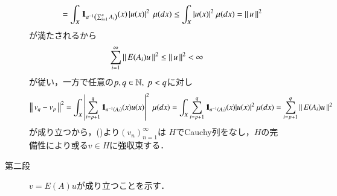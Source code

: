 \begin{prf}
\begin{description}
\begin{description}
\begin{align}
							&\qquad = \int_X \mbox{1}\hspace{-0.25em}\mbox{l}_{a^{-1}\left( \sum_{i=1}^{n}A_i \right)}(x) \left| u(x) \right|^2\ \mu(dx)
							\leq \int_X |u(x)|^2\ \mu(dx)
							= \left\|\, u\, \right\|_{}^2
						\end{align}
						が満たされるから
						\begin{align}
							\sum_{i=1}^{\infty} \left\|\, E(A_i) u\, \right\|_{}^2 \leq \left\|\, u\, \right\|_{}^2 < \infty
							\label{eq:report_9_2}
						\end{align}
						が従い，一方で任意の$p,q \in \mathbb{N},\ p < q$に対し
						\begin{align}
							\left\|\, v_q - v_p\, \right\|_{}^2
							= \int_X \left| \sum_{i=p+1}^{q} \mbox{1}\hspace{-0.25em}\mbox{l}_{a^{-1}(A_i)}(x) u(x) \right|^2\ \mu(dx)
							= \int_X \sum_{i=p+1}^{q} \mbox{1}\hspace{-0.25em}\mbox{l}_{a^{-1}(A_i)}(x) |u(x)|^2\ \mu(dx)
							= \sum_{i=p+1}^{q} \left\|\, E(A_i) u\, \right\|_{}^2
						\end{align}
						が成り立つから，()より$(v_n)_{n=1}^{\infty}$は
						$H$でCauchy列をなし，$H$の完備性により或る$v \in H$に強収束する．
					\item[第二段]
						$v = E(A)u$が成り立つことを示す．
				\end{description}
				

\end{description}
\end{prf}

